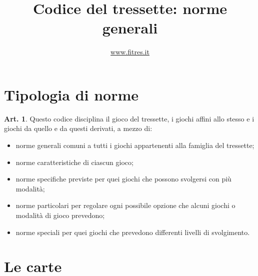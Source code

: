 \documentclass[italian,a4paper]{article}
\title{Codice del tressette: norme generali}
\author{\url{www.fitres.it}}
\date{}
\theoremstyle{definition}
\newtheorem{art}{Art.}
\newenvironment{packeditem}{
\begin{itemize}
  \setlength{\itemsep}{1pt}
  \setlength{\parskip}{0pt}
  \setlength{\parsep}{0pt}
}{\end{itemize}}
\begin{document}
\maketitle
\section{Tipologia di norme}
\begin{art}
    Questo codice disciplina il gioco del tressette, i giochi affini allo stesso e i giochi da quello e da questi derivati, a mezzo di:
    \begin{packeditem}
\item      norme generali  comuni a tutti i giochi appartenenti alla famiglia del tressette;
\item     norme caratteristiche  di ciascun gioco;
\item     norme specifiche  previste per  quei giochi che possono svolgersi con più modalità;
\item     norme particolari  per regolare ogni possibile opzione che alcuni giochi o modalità di gioco prevedono;
\item     norme speciali  per quei giochi che prevedono differenti livelli di svolgimento.
    \end{packeditem}
\end{art}
\section{Le carte}
\end{document}
